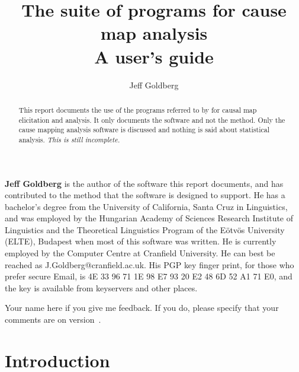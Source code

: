 \documentclass[%
	11pt,
        a4paper,
        twoside]{workrep}
\title{The \dram suite of programs for cause map analysis\\
   A user's guide}
\author{Jeff Goldberg}
\begin{document}
\maketitle
\thispagestyle{empty}
\begin{prepage}
  \begin{abstract}
    This report documents the use of the programs referred to by
     for causal map elicitation
    and analysis.  It only documents the software and not the method.
    Only the cause mapping analysis software is discussed and nothing
    is said about statistical analysis.
    \emph{This is still incomplete.}
  \end{abstract}
  \begin{egotrip}
    \textbf{Jeff Goldberg} is the author of the software this report
    documents, and has contributed to the method that the software
    is designed to support.  He has a bachelor's degree from
    the University of California, Santa Cruz in Linguistics, and
    was employed by the Hungarian Academy of Sciences
    Research Institute of Linguistics and the Theoretical Linguistics
    Program of the E\"otv\"os University (ELTE), Budapest when most
    of this software was written.  He is currently employed by the
    Computer Centre at Cranfield University.  He can
    best be reached as \textsf{J.Goldberg@cranfield.ac.uk}.  His
    PGP key finger print, for those who prefer secure Email, is
    \textsf{4E 33 96 71 1E 98 E7 93  20 E2 48 6D 52 A1 71 E0},
    and the key is available from keyservers and other places.
  \end{egotrip}
  \begin{acknowledgements}
    Your name here if you give me feedback.  If you do, please
    specify that your comments are on version~\version.
  \end{acknowledgements}
\end{prepage}
\tableofcontents
\cleardoublepage
{}
\chapter{Introduction}
\end{document}
